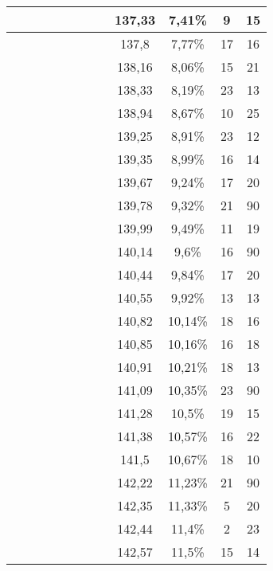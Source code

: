 \begin{center}
\begin{longtable}{|c|c|c|c|c|c|c|c|c|c|c|c|}
 \x &  &  &  &  &  \x &  &  & 137,33 & 7,41\% & 9 & 15  \\ \hline
 \x &  &  &  \x &  \x &  \x &  &  \x & 137,8 & 7,77\% & 17 & 16  \\ \hline
 \x &  \x &  &  &  \x &  \x &  &  & 138,16 & 8,06\% & 15 & 21  \\ \hline
 \x &  &  \x &  &  &  &  &  & 138,33 & 8,19\% & 23 & 13  \\ \hline
 \x &  \x &  &  \x &  &  \x &  &  & 138,94 & 8,67\% & 10 & 25  \\ \hline
 \x &  \x &  &  &  &  &  &  \x & 139,25 & 8,91\% & 23 & 12  \\ \hline
 \x &  \x &  &  &  &  \x &  &  & 139,35 & 8,99\% & 16 & 14  \\ \hline
 \x &  \x &  \x &  &  &  &  &  & 139,67 & 9,24\% & 17 & 20  \\ \hline
 \x &  &  \x &  &  \x &  \x &  &  \x & 139,78 & 9,32\% & 21 & 90  \\ \hline
 \x &  \x &  \x &  \x &  &  &  &  & 139,99 & 9,49\% & 11 & 19  \\ \hline
 \x &  &  &  &  &  &  &  \x & 140,14 & 9,6\% & 16 & 90  \\ \hline
 \x &  &  &  &  \x &  &  &  \x & 140,44 & 9,84\% & 17 & 20  \\ \hline
 \x &  &  &  \x &  &  \x &  &  & 140,55 & 9,92\% & 13 & 13  \\ \hline
 \x &  &  \x &  &  &  \x &  &  & 140,82 & 10,14\% & 18 & 16  \\ \hline
 \x &  \x &  \x &  &  &  &  &  \x & 140,85 & 10,16\% & 16 & 18  \\ \hline
 \x &  \x &  \x &  \x &  &  \x &  &  \x & 140,91 & 10,21\% & 18 & 13  \\ \hline
 \x &  \x &  &  &  &  &  &  & 141,09 & 10,35\% & 23 & 90  \\ \hline
 \x &  &  \x &  &  &  &  &  \x & 141,28 & 10,5\% & 19 & 15  \\ \hline
 \x &  &  \x &  &  \x &  &  &  \x & 141,38 & 10,57\% & 16 & 22  \\ \hline
 \x &  &  &  &  \x &  &  &  & 141,5 & 10,67\% & 18 & 10  \\ \hline
 \x &  &  &  &  \x &  \x &  &  & 142,22 & 11,23\% & 21 & 90  \\ \hline
 \x &  \x &  \x &  \x &  &  \x &  \x &  \x & 142,35 & 11,33\% & 5 & 20  \\ \hline
 \x &  \x &  &  \x &  \x &  &  &  \x & 142,44 & 11,4\% & 2 & 23  \\ \hline
 \x &  \x &  \x &  &  &  \x &  \x &  \x & 142,57 & 11,5\% & 15 & 14  \\ \hline

\end{longtable}
\end{center}
